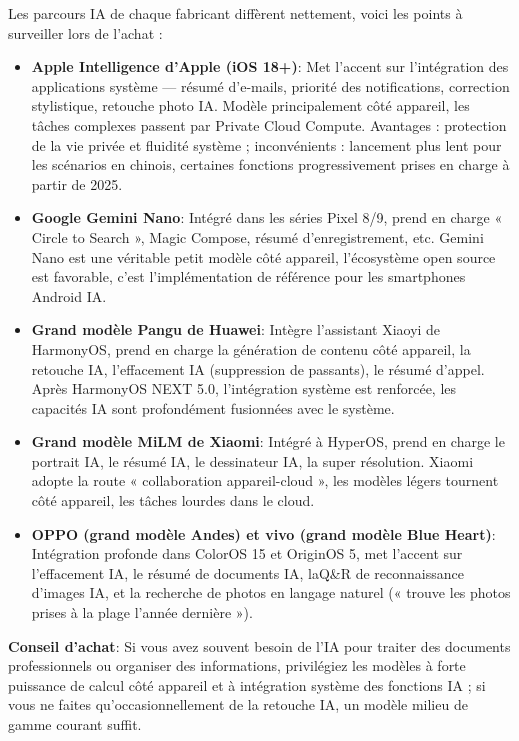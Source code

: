 
Les parcours IA de chaque fabricant diffèrent nettement, voici les points à surveiller lors de l'achat :

\begin{itemize}
  \item \textbf{Apple Intelligence d'Apple (iOS 18+)}: Met l'accent sur l'intégration des applications système — résumé d'e-mails, priorité des notifications, correction stylistique, retouche photo IA. Modèle principalement côté appareil, les tâches complexes passent par Private Cloud Compute. Avantages : protection de la vie privée et fluidité système ; inconvénients : lancement plus lent pour les scénarios en chinois, certaines fonctions progressivement prises en charge à partir de 2025.
  \item \textbf{Google Gemini Nano}: Intégré dans les séries Pixel 8/9, prend en charge « Circle to Search », Magic Compose, résumé d'enregistrement, etc. Gemini Nano est une véritable petit modèle côté appareil, l'écosystème open source est favorable, c'est l'implémentation de référence pour les smartphones Android IA.
  \item \textbf{Grand modèle Pangu de Huawei}: Intègre l'assistant Xiaoyi de HarmonyOS, prend en charge la génération de contenu côté appareil, la retouche IA, l'effacement IA (suppression de passants), le résumé d'appel. Après HarmonyOS NEXT 5.0, l'intégration système est renforcée, les capacités IA sont profondément fusionnées avec le système.
  \item \textbf{Grand modèle MiLM de Xiaomi}: Intégré à HyperOS, prend en charge le portrait IA, le résumé IA, le dessinateur IA, la super résolution. Xiaomi adopte la route « collaboration appareil-cloud », les modèles légers tournent côté appareil, les tâches lourdes dans le cloud.
  \item \textbf{OPPO (grand modèle Andes) et vivo (grand modèle Blue Heart)}: Intégration profonde dans ColorOS 15 et OriginOS 5, met l'accent sur l'effacement IA, le résumé de documents IA, laQ\&R de reconnaissance d'images IA, et la recherche de photos en langage naturel (« trouve les photos prises à la plage l'année dernière »).
\end{itemize}

\textbf{Conseil d'achat}: Si vous avez souvent besoin de l'IA pour traiter des documents professionnels ou organiser des informations, privilégiez les modèles à forte puissance de calcul côté appareil et à intégration système des fonctions IA ; si vous ne faites qu'occasionnellement de la retouche IA, un modèle milieu de gamme courant suffit.

